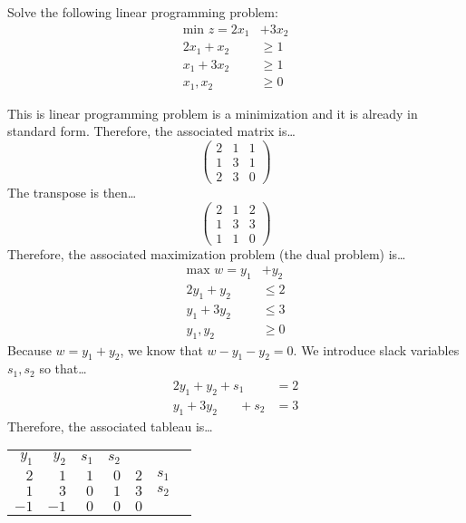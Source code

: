 \documentclass[11pt,letterpaper]{article}
\begin{document}
\newpage



 Solve the following linear programming problem:
	\[
	\begin{aligned}
	\text{min } z= 2x_1 &+ 3x_2 \\
	2x_1 + x_2&\geq 1 \\
	x_1 + 3x_2&\geq 1 \\
	x_1, x_2&\geq 0 
	\end{aligned}
	\] \pspace

\sol This is linear programming problem is a minimization and it is already in standard form. Therefore, the associated matrix is\dots
	\[
	\begin{pmatrix}
	2 & 1 & 1 \\
	1 & 3 & 1 \\
	2 & 3 & 0 
	\end{pmatrix}
	\]
The transpose is then\dots
	\[
	\begin{pmatrix}
	2 & 1 & 2 \\
	1 & 3 & 3 \\
	1 & 1 & 0 
	\end{pmatrix}
	\]
Therefore, the associated maximization problem (the dual problem) is\dots
	\[
	\begin{aligned}
	\text{max }  w= y_1 &+ y_2 \\
	2y_1 + y_2&\leq 2 \\
	y_1 + 3y_2&\leq 3 \\
	y_1, y_2&\geq 0
	\end{aligned}
	\] 
Because $w= y_1 + y_2$, we know that $w - y_1 - y_2= 0$. We introduce slack variables $s_1, s_2$ so that\dots
	\[
	\begin{aligned}	
	2y_1 + y_2 + s_1 \phantom{+ s_2}&= 2 \\
	y_1 + 3y_2 \phantom{+ s_1} + s_2&= 3
	\end{aligned}
	\] 
Therefore, the associated tableau is\dots

	\begin{table}[!ht]
	\centering
	\begin{tabular}{rrrrrrr}
	{\small $y_1$} & {\small $y_2$} & {\small $s_1$} & {\small $s_2$} \\
	$2$ & $1$ & $1$ & \multicolumn{1}{r|}{$0$} & $2$ & {\small $s_1$} \\
	$1$ & $3$ & $0$ & \multicolumn{1}{r|}{$1$} & $3$ & {\small $s_2$} \\ \cline{1-5}
	$-1$ & $-1$ & $0$ & \multicolumn{1}{r|}{$0$} & $0$ 
	\end{tabular}
	\end{table}
\end{document}
